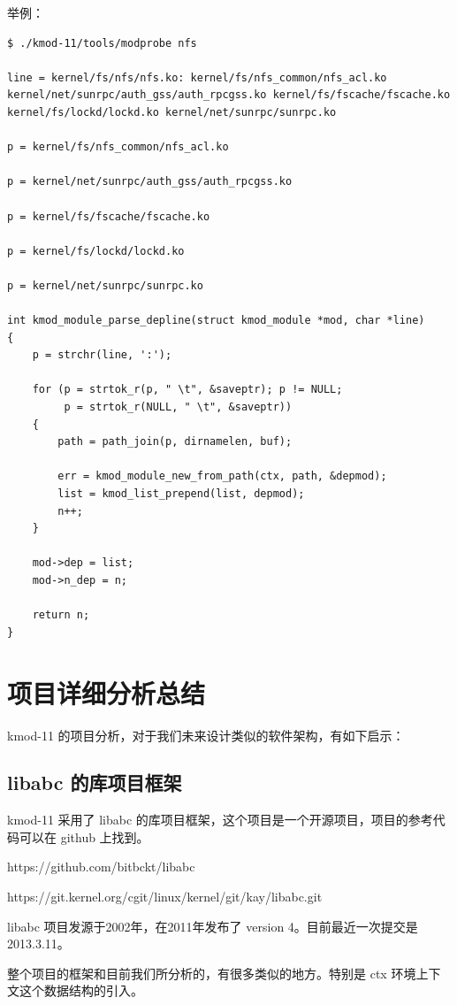 举例：

{\begin{shaded}\begin{verbatim}
$ ./kmod-11/tools/modprobe nfs

line = kernel/fs/nfs/nfs.ko: kernel/fs/nfs_common/nfs_acl.ko kernel/net/sunrpc/auth_gss/auth_rpcgss.ko kernel/fs/fscache/fscache.ko kernel/fs/lockd/lockd.ko kernel/net/sunrpc/sunrpc.ko

p = kernel/fs/nfs_common/nfs_acl.ko

p = kernel/net/sunrpc/auth_gss/auth_rpcgss.ko

p = kernel/fs/fscache/fscache.ko

p = kernel/fs/lockd/lockd.ko

p = kernel/net/sunrpc/sunrpc.ko

int kmod_module_parse_depline(struct kmod_module *mod, char *line)
{
    p = strchr(line, ':');

    for (p = strtok_r(p, " \t", &saveptr); p != NULL;
         p = strtok_r(NULL, " \t", &saveptr)) 
    {
        path = path_join(p, dirnamelen, buf);

        err = kmod_module_new_from_path(ctx, path, &depmod);
        list = kmod_list_prepend(list, depmod);
        n++;
    }

    mod->dep = list;
    mod->n_dep = n;

    return n;
}
\end{verbatim}\end{shaded}}
\section{项目详细分析总结}

kmod-11 的项目分析，对于我们未来设计类似的软件架构，有如下启示：

\subsection{libabc 的库项目框架}

kmod-11 采用了 libabc
的库项目框架，这个项目是一个开源项目，项目的参考代码可以在 github 上找到。

https://github.com/bitbckt/libabc

https://git.kernel.org/cgit/linux/kernel/git/kay/libabc.git

libabc 项目发源于2002年，在2011年发布了 version
4。目前最近一次提交是2013.3.11。

整个项目的框架和目前我们所分析的，有很多类似的地方。特别是 ctx
环境上下文这个数据结构的引入。

